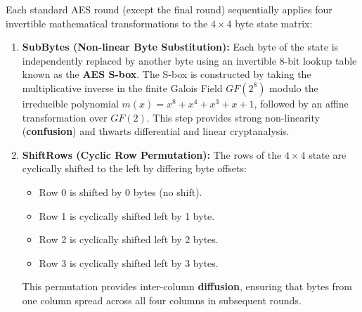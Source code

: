 Each standard AES round (except the final round) sequentially applies four invertible mathematical transformations to the $4 \times 4$ byte state matrix:

\begin{enumerate}
\item \textbf{SubBytes (Non-linear Byte Substitution):}
Each byte of the state is independently replaced by another byte using an invertible 8-bit lookup table known as the \textbf{AES S-box}. The S-box is constructed by taking the multiplicative inverse in the finite Galois Field $GF(2^8)$ modulo the irreducible polynomial $m(x) = x^8 + x^4 + x^3 + x + 1$, followed by an affine transformation over $GF(2)$. This step provides strong non-linearity (\textbf{confusion}) and thwarts differential and linear cryptanalysis.

\item \textbf{ShiftRows (Cyclic Row Permutation):}
The rows of the $4 \times 4$ state are cyclically shifted to the left by differing byte offsets:
\begin{itemize}
\item Row 0 is shifted by 0 bytes (no shift).
\item Row 1 is cyclically shifted left by 1 byte.
\item Row 2 is cyclically shifted left by 2 bytes.
\item Row 3 is cyclically shifted left by 3 bytes.
\end{itemize}
This permutation provides inter-column \textbf{diffusion}, ensuring that bytes from one column spread across all four columns in subsequent rounds.


\end{enumerate}
